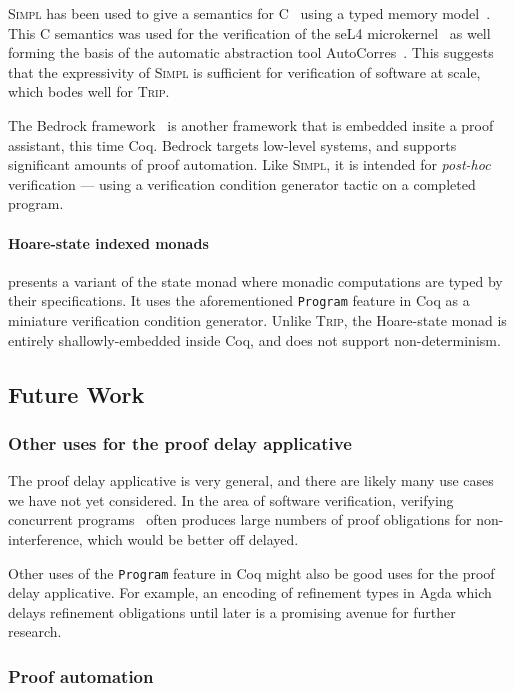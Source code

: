 \documentclass[sigplan,review]{acmart}\settopmatter{printfolios=true,printccs=false,printacmref=false}
\begin{document}
\textsc{Simpl} has been used to give a semantics for C~\citep{csem} using a 
typed memory model~\citep{cmem}. This C semantics was used for the verification 
of the seL4 microkernel~\citep{sel4} as well forming the basis of the automatic 
abstraction tool AutoCorres~\citep{autocorres1, autocorres2}.  This suggests that the 
expressivity of \textsc{Simpl} is sufficient for verification of software at scale,
which bodes well for \textsc{Trip}.

The Bedrock framework~\citep{bedrock} is another framework that is embedded 
insite a proof assistant, this time Coq. Bedrock targets low-level systems, 
and supports significant amounts of proof automation. Like \textsc{Simpl}, it
is intended for \emph{post-hoc} verification --- using a verification condition
generator tactic on a completed program.

\paragraph{Hoare-state indexed monads}
\citet{Swierstra} presents a variant of the state monad where monadic 
computations are typed by their specifications. It uses the aforementioned 
\texttt{Program} feature in Coq as a miniature verification condition generator.
Unlike \textsc{Trip}, the Hoare-state monad is entirely shallowly-embedded inside
Coq, and does not support non-determinism.


\subsection{Future Work}\label{subsec:futurework}

\subsubsection{Other uses for the proof delay applicative}
The proof delay applicative is very general, and there are likely many use 
cases we have not yet considered. In the area of software verification,  
verifying concurrent programs~\citep{owickigries} often produces large numbers of proof obligations for 
non-interference, which would be better off delayed. 

Other uses of the \texttt{Program} feature in Coq might also be good uses for 
the proof delay applicative. For example, an encoding of refinement types
in Agda which delays refinement obligations until later is a promising 
avenue for further research.

\subsubsection{Proof automation}
\end{document}
